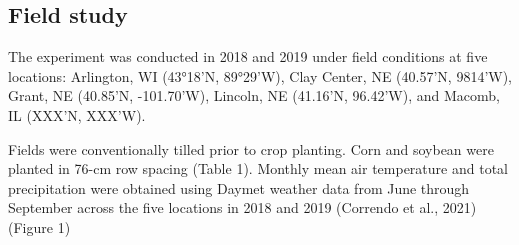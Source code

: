 \documentclass[utf8]{frontiersSCNS}
\begin{document}
\hypertarget{field-study}{%
\subsection*{Field study}\label{field-study}}

The experiment was conducted in 2018 and 2019 under field conditions at
five locations: Arlington, WI (43°18'N, 89°29'W), Clay Center, NE
(40.57'N, 9814'W), Grant, NE (40.85'N, -101.70'W), Lincoln, NE (41.16'N,
96.42'W), and Macomb, IL (XXX'N, XXX'W).

Fields were conventionally tilled prior to crop planting. Corn and
soybean were planted in 76-cm row spacing (Table 1). Monthly mean air
temperature and total precipitation were obtained using Daymet weather
data from June through September across the five locations in 2018 and
2019 (Correndo et al., 2021) (Figure 1)
\end{document}
